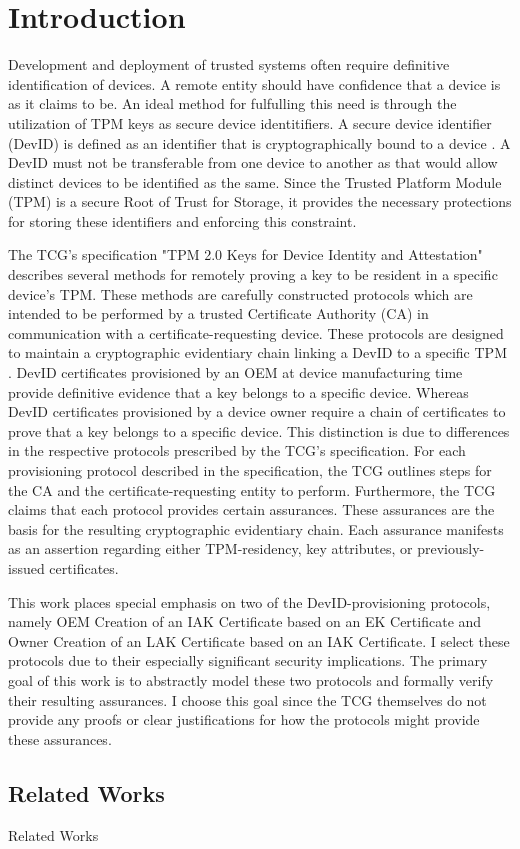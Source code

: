 \chapter{Introduction}



Development and deployment of trusted systems often require definitive identification of devices. A remote entity should have confidence that a device is as it claims to be. An ideal method for fulfulling this need is through the utilization of TPM keys as secure device identitifiers. A secure device identifier (DevID) is defined as an identifier that is cryptographically bound to a device \cite{DevIDSpec-IEEE}. 
A DevID must not be transferable from one device to another as that would allow distinct devices to be identified as the same. 
Since the Trusted Platform Module (TPM) is a secure Root of Trust for Storage, it provides the necessary protections for storing these identifiers and enforcing this constraint. 

The TCG's specification "TPM 2.0 Keys for Device Identity and Attestation" describes several methods for remotely proving a key to be resident in a specific device's TPM. These methods are carefully constructed protocols which are intended to be performed by a trusted Certificate Authority (CA) in communication with a certificate-requesting device. These protocols are designed to maintain a cryptographic evidentiary chain linking a DevID to a specific TPM \cite{DevIDSpec-TCG}. 
DevID certificates provisioned by an OEM at device manufacturing time provide definitive evidence that a key belongs to a specific device. Whereas DevID certificates provisioned by a device owner require a chain of certificates to prove that a key belongs to a specific device. This distinction is due to differences in the respective protocols prescribed by the TCG's specification. 
For each provisioning protocol described in the specification, the TCG outlines steps for the CA and the certificate-requesting entity to perform. Furthermore, the TCG claims that each protocol provides certain assurances. These assurances are the basis for the resulting cryptographic evidentiary chain.
Each assurance manifests as an assertion regarding either TPM-residency, key attributes, or previously-issued certificates.

This work places special emphasis on two of the DevID-provisioning protocols, namely OEM Creation of an IAK Certificate based on an EK Certificate and Owner Creation of an LAK Certificate based on an IAK Certificate. I select these protocols due to their especially significant security implications. The primary goal of this work is to abstractly model these two protocols and formally verify their resulting assurances. I choose this goal since the TCG themselves do not provide any proofs or clear justifications for how the protocols might provide these assurances. 





\section{Related Works}
Related Works
\cite{DAAAnalysis}
\cite{TPM12Model}
\cite{PrivacyCAAnalysis}
\cite{AuthAnalysis}
\cite{PCRAnalysis}
\cite{EAAnalysis}
\cite{HMACAnalysis}



